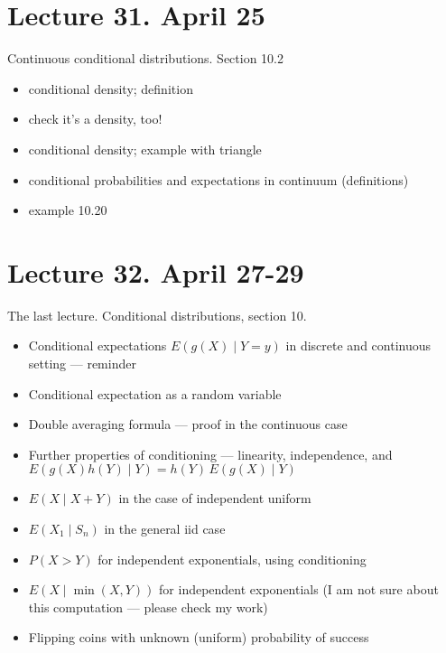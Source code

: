 \documentclass[letterpaper,11pt,oneside,reqno]{amsart}
\numberwithin{equation}{section}
\theoremstyle{definition}
\begin{document}
\section*{Lecture 31. April 25}

Continuous conditional distributions. Section 10.2
\begin{itemize}
\item conditional density; definition
\item check it's a density, too!
\item conditional density; example with triangle
\item conditional probabilities and expectations in continuum (definitions)
\item example 10.20
\end{itemize}

\section*{Lecture 32. April 27-29}

The last lecture.
Conditional distributions, section 10.
\begin{itemize}
	\item Conditional expectations $E(g(X)\mid Y=y)$ in discrete and continuous setting --- reminder
	\item Conditional expectation as a random variable
	\item Double averaging formula --- proof in the continuous case
	\item Further properties of conditioning --- linearity, independence,
		and $E(g(X)h(Y)\mid Y)=h(Y)\,E(g(X)\mid Y)$
	\item $E(X\mid X+Y)$ in the case of independent uniform
	\item $E(X_1\mid S_n)$ in the general iid case
	\item $P(X>Y)$ for independent exponentials, using conditioning
	\item $E(X\mid \min(X,Y))$ for independent exponentials
		(I am not sure about this computation --- please check my work)
	\item Flipping coins with unknown (uniform) probability of success
\end{itemize}
\end{document}
